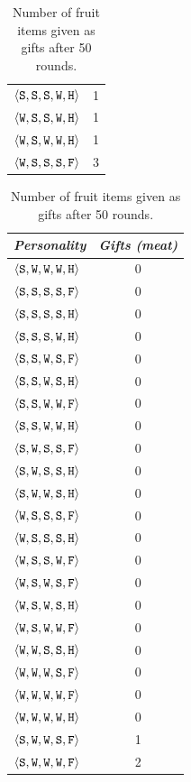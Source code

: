 \begin{table}
{{\begin{minipage}[b]{0.30\hsize}
\begin{tabular}{ l | c }
					$\personality{S}{S}{S}{W}{H}$ & 1\\
					$\personality{W}{S}{S}{W}{H}$ & 1\\
					$\personality{W}{S}{W}{W}{H}$ & 1\\
					$\personality{W}{S}{S}{S}{F}$ & 3\\
				\end{tabular}
				\caption{Number of fruit items given as gifts after 50 rounds.}
				\label{tab:numFruitGiven}
			\end{minipage}
			\hfill
			\begin{minipage}[b]{0.30\hsize}\centering
				\begin{tabular}{ l | c }
					\emph{Personality} & \emph{Gifts (meat)} \\
					\hline
					$\personality{S}{W}{W}{W}{H}$ & 0\\
					$\personality{S}{S}{S}{S}{F}$ & 0\\
					$\personality{S}{S}{S}{S}{H}$ & 0\\
					$\personality{S}{S}{S}{W}{H}$ & 0\\
					$\personality{S}{S}{W}{S}{F}$ & 0\\
					$\personality{S}{S}{W}{S}{H}$ & 0\\
					$\personality{S}{S}{W}{W}{F}$ & 0\\
					$\personality{S}{S}{W}{W}{H}$ & 0\\
					$\personality{S}{W}{S}{S}{F}$ & 0\\
					$\personality{S}{W}{S}{S}{H}$ & 0\\
					$\personality{S}{W}{W}{S}{H}$ & 0\\
					$\personality{W}{S}{S}{S}{F}$ & 0\\
					$\personality{W}{S}{S}{S}{H}$ & 0\\
					$\personality{W}{S}{S}{W}{F}$ & 0\\
					$\personality{W}{S}{W}{S}{F}$ & 0\\
					$\personality{W}{S}{W}{S}{H}$ & 0\\
					$\personality{W}{S}{W}{W}{F}$ & 0\\
					$\personality{W}{W}{S}{S}{H}$ & 0\\
					$\personality{W}{W}{W}{S}{F}$ & 0\\
					$\personality{W}{W}{W}{W}{F}$ & 0\\
					$\personality{W}{W}{W}{W}{H}$ & 0\\
					$\personality{S}{W}{W}{S}{F}$ & 1\\
					$\personality{S}{W}{W}{W}{F}$ & 2\\

\end{tabular}
\end{minipage}}}
\end{table}
